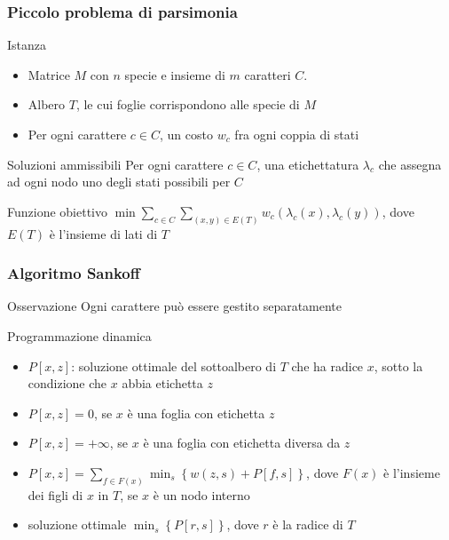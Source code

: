 \begin{frame}[fragile]
\frametitle{Piccolo problema di parsimonia}
\begin{block}{Istanza}
\begin{itemize}
\item
Matrice $M$ con $n$ specie e insieme di $m$ caratteri $C$.
\item
Albero $T$, le cui foglie corrispondono alle specie di $M$
\item
Per ogni carattere $c\in C$, un costo $w_{c}$ fra ogni coppia di stati
\end{itemize}
\end{block}
\begin{block}{Soluzioni ammissibili}
Per ogni carattere $c\in C$, una etichettatura $\lambda_{c}$ che assegna ad ogni nodo
uno degli stati possibili per $C$
\end{block}
\begin{block}{Funzione obiettivo}
$\min \sum_{c\in C} \sum_{(x,y)\in E(T)} w_{c}(\lambda_{c}(x), \lambda_{c}(y))$, dove $E(T)$ è
l'insieme di lati di $T$
\end{block}
\end{frame}

\begin{frame}[fragile]
\frametitle{Algoritmo Sankoff}
\begin{block}{Osservazione}
Ogni carattere può essere gestito separatamente
\end{block}

\begin{block}{Programmazione dinamica}
\begin{itemize}
\item
$P[x,z]$: soluzione ottimale del sottoalbero di $T$ che ha radice $x$, sotto la
condizione che $x$ abbia etichetta $z$
\item
$P[x,z] = 0$, se $x$ è una foglia con etichetta $z$
\item
$P[x,z] = +\infty$, se $x$ è una foglia con etichetta diversa da $z$
\item
$P[x,z] = \sum_{f \in F(x)} \min_{s} \left\{ w(z,s) + P[f,s] \right\}$, dove $F(x)$ è
l'insieme dei figli di $x$ in $T$, se $x$ è un nodo interno
\item
soluzione ottimale $\min_{s} \left\{ P[r,s] \right\}$, dove $r$ è la radice di
$T$
\end{itemize}
\end{block}
\end{frame}


